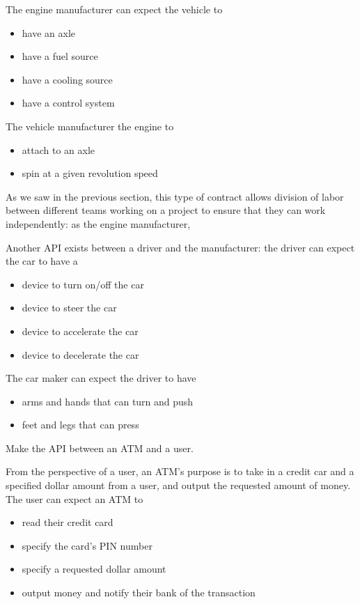 The engine manufacturer can expect the vehicle to
\begin{itemize}
	\item have an axle 
	\item have a fuel source
	\item have a cooling source
	\item have a control system
\end{itemize}

The vehicle manufacturer the engine to
\begin{itemize}
	\item attach to an axle
	\item spin at a given revolution speed
\end{itemize}

As we saw in the previous section, this type of contract allows division of labor between different teams working on a project to ensure that they can work independently: as the engine manufacturer, 

Another API exists between a driver and the manufacturer: the driver can expect the car to have a 
\begin{itemize}
	\item device to turn on/off the car
	\item device to steer the car
	\item device to accelerate the car
	\item  device to decelerate the car
\end{itemize}

The car maker can expect the driver to have
\begin{itemize}
	\item arms and hands that can turn and push 
	\item feet and legs that can press 
\end{itemize}

\begin{example}
Make the API between an ATM and a user. 
\end{example}

From the perspective of a user, an ATM's purpose is to take in a credit car and a specified dollar amount from a user, and output the requested amount of money. The user can expect an ATM to
\begin{itemize}
	\item read their credit card
	\item specify the card's PIN number
	\item specify a requested dollar amount
	\item output money and notify their bank of the transaction
\end{itemize}

